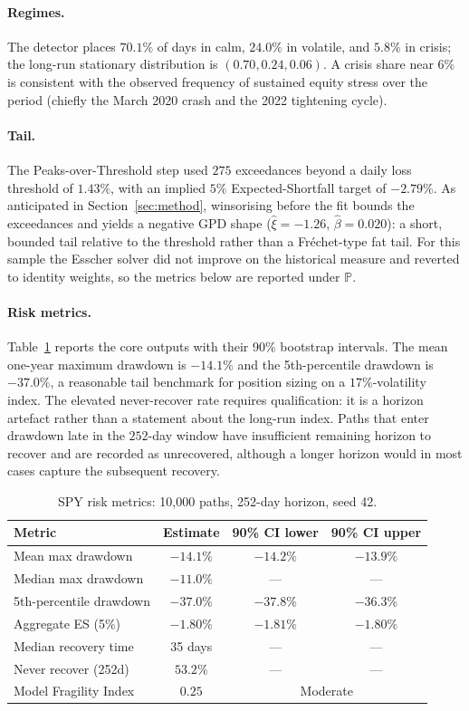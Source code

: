 \documentclass[11pt]{article}
\newcommand{\Prob}{\mathbb{P}}
\theoremstyle{definition}
\begin{document}
\paragraph{Regimes.}
The detector places $70.1\%$ of days in calm, $24.0\%$ in volatile, and $5.8\%$
in crisis; the long-run stationary distribution is $(0.70,0.24,0.06)$. A crisis
share near $6\%$ is consistent with the observed frequency of sustained equity
stress over the period (chiefly the March 2020 crash and the 2022 tightening
cycle).

\paragraph{Tail.}
The Peaks-over-Threshold step used $275$ exceedances beyond a daily loss
threshold of $1.43\%$, with an implied $5\%$ Expected-Shortfall target of
$-2.79\%$. As anticipated in Section~\ref{sec:method}, winsorising before the
fit bounds the exceedances and yields a negative GPD shape ($\hat\xi=-1.26$,
$\hat\beta=0.020$): a short, bounded tail relative to the threshold rather than
a Fr\'echet-type fat tail. For this sample the Esscher solver did not improve on
the historical measure and reverted to identity weights, so the metrics below
are reported under $\Prob$.

\paragraph{Risk metrics.}
Table~\ref{tab:spy} reports the core outputs with their 90\% bootstrap intervals.
The mean one-year maximum drawdown is $-14.1\%$ and the 5th-percentile drawdown is
$-37.0\%$, a reasonable tail benchmark for position sizing on a $17\%$-volatility
index. The elevated never-recover rate requires qualification: it is a horizon
artefact rather than a statement about the long-run index. Paths that enter
drawdown late in the $252$-day window have insufficient remaining horizon to
recover and are recorded as unrecovered, although a longer horizon would in most
cases capture the subsequent recovery.

\begin{table}[h]
\centering
\caption{SPY risk metrics: 10{,}000 paths, 252-day horizon, seed 42.}
\label{tab:spy}
\begin{tabular}{lccc}
\toprule
Metric & Estimate & 90\% CI lower & 90\% CI upper \\
\midrule
Mean max drawdown        & $-14.1\%$ & $-14.2\%$ & $-13.9\%$ \\
Median max drawdown      & $-11.0\%$ & --- & --- \\
5th-percentile drawdown  & $-37.0\%$ & $-37.8\%$ & $-36.3\%$ \\
Aggregate ES (5\%)       & $-1.80\%$ & $-1.81\%$ & $-1.80\%$ \\
Median recovery time     & 35 days & --- & --- \\
Never recover (252d)     & $53.2\%$ & --- & --- \\
Model Fragility Index    & $0.25$ & \multicolumn{2}{c}{Moderate} \\
\bottomrule
\end{tabular}
\end{table}
\end{document}
